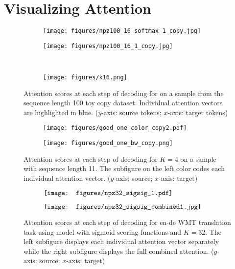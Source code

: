 \documentclass[11pt,letterpaper]{article}
\begin{document}
\section{Visualizing Attention}
\label{sec:visualizing_attention}

\begin{figure*}[htb!]
\centering
\begin{subfigure}[b]{0.475\textwidth}
    \texttt{[image: figures/npz100\_16\_softmax\_1\_copy.jpg]}
\end{subfigure}\hspace{.11 cm}
\begin{subfigure}[b]{0.475\textwidth}
    \texttt{[image: figures/npz100\_16\_1\_copy.jpg]}
\end{subfigure}\\
\begin{subfigure}[b]{1.\textwidth}
\texttt{[image: figures/k16.png]}
\end{subfigure}
\caption{Attention scores at each step of decoding for on a sample from the sequence length 100 toy copy dataset. Individual attention vectors are highlighted in blue. ($y$-axis: source tokens; $x$-axis: target tokens)}
\label{fig:k16_attention}
\end{figure*}
\begin{figure*}[htb!]
\vspace{-0.14 cm}
\centering
\begin{subfigure}[b]{0.385\textwidth}
    \texttt{[image: figures/good\_one\_color\_copy2.pdf]}
\end{subfigure}
\begin{subfigure}[b]{0.375\textwidth}
    \texttt{[image: figures/good\_one\_bw\_copy.png]}
\end{subfigure}
\caption{Attention scores at each step of decoding for $K=4$ on a sample with sequence length 11. The subfigure on the left color codes each individual attention vector. ($y$-axis: source; $x$-axis: target)}
\label{fig:k4_attention}
\end{figure*}
\begin{figure*}[htb!]
\vspace{-0.08 cm}
\centering
\begin{subfigure}[b]{0.73\textwidth}
    $\vcenter{\hbox{\texttt{[image: figures/npz32\_sigsig\_1.pdf]}}}$
\end{subfigure}
\begin{subfigure}[b]{0.23\textwidth}
    $\vcenter{\hbox{\texttt{[image: figures/npz32\_sigsig\_combined1.jpg]}}}$
\end{subfigure}
\caption{Attention scores at each step of decoding for en-de WMT translation task using model with sigmoid scoring functions and $K=32$. The left subfigure displays each individual attention vector separately while the right subfigure displays the full combined attention. ($y$-axis: source; $x$-axis: target)}
\label{fig:attention_scores}
\end{figure*}
\end{document}

